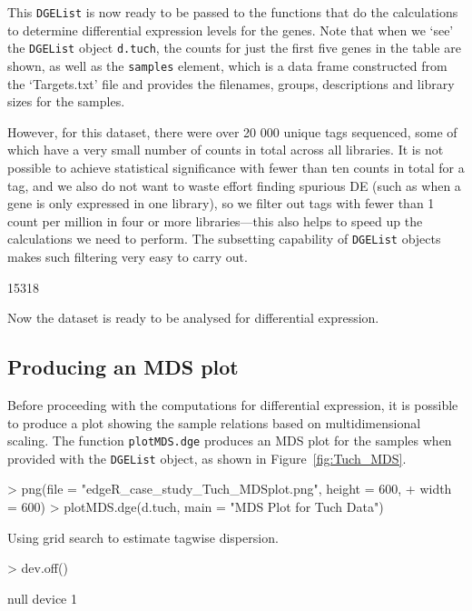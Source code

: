 This \texttt{DGEList} is now ready to be passed to the functions that
do the calculations to determine differential expression levels for
the genes. Note that when we `see' the \texttt{DGEList} object
\texttt{d.tuch}, the counts for just the first five genes in the table
are shown, as well as the \texttt{samples} element, which is a data
frame constructed from the `Targets.txt' file and provides the
filenames, groups, descriptions and library sizes for the samples.

However, for this dataset, there were over 20 000 unique tags
sequenced, some of which have a very small number of counts in total
across all libraries. It is not possible to achieve statistical
significance with fewer than ten counts in total for a tag, and we
also do not want to waste effort finding spurious DE (such as when a
gene is only expressed in one library), so we filter
out tags with fewer than 1 count per million in four or more libraries---this
also helps to speed up the calculations we need to perform. The
subsetting capability of \texttt{DGEList} objects makes such filtering
very easy to carry out.

\begin{Schunk}
\begin{Soutput}
[1] 15318
\end{Soutput}
\end{Schunk}

Now the dataset is ready to be analysed for differential expression.

\subsection{Producing an MDS plot}

Before proceeding with the computations for differential expression,
it is possible to produce a plot showing the sample relations based on
multidimensional scaling. The function \texttt{plotMDS.dge} produces
an MDS plot for the samples when provided with the \texttt{DGEList}
object, as shown in Figure~\ref{fig:Tuch_MDS}.

\begin{Schunk}
\begin{Sinput}
> png(file = "edgeR_case_study_Tuch_MDSplot.png", height = 600, 
+     width = 600)
> plotMDS.dge(d.tuch, main = "MDS Plot for Tuch Data")
\end{Sinput}
\begin{Soutput}
Using grid search to estimate tagwise dispersion. 
\end{Soutput}
\begin{Sinput}
> dev.off()
\end{Sinput}
\begin{Soutput}
null device 
          1 
\end{Soutput}
\end{Schunk}

